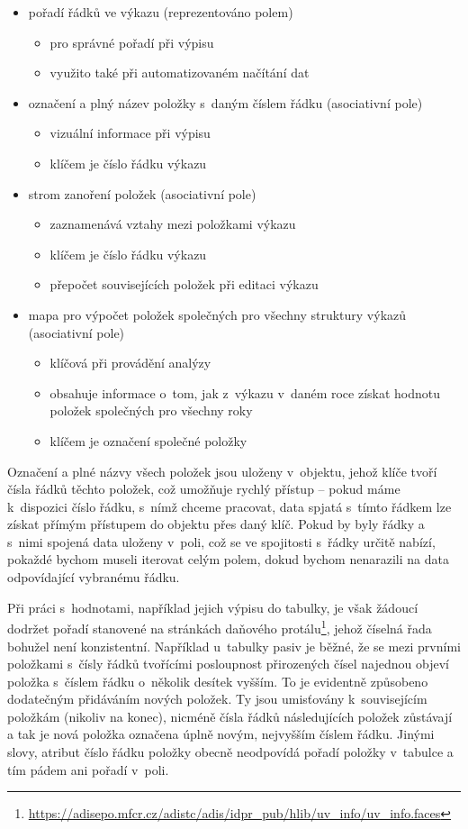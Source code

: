 \begin{itemize}
\item pořadí řádků ve výkazu (reprezentováno polem)
  \begin{itemize}
    \item pro správné pořadí při výpisu
    \item využito také při automatizovaném načítání dat
  \end{itemize}
\item označení a plný název položky s~daným číslem řádku (asociativní pole)
  \begin{itemize}
    \item vizuální informace při výpisu
    \item klíčem je číslo řádku výkazu
  \end{itemize}
\item strom zanoření položek (asociativní pole)
  \begin{itemize}
    \item zaznamenává vztahy mezi položkami výkazu
    \item klíčem je číslo řádku výkazu
    \item přepočet souvisejících položek při editaci výkazu
  \end{itemize}
\item mapa pro výpočet položek společných pro všechny struktury výkazů (asociativní pole)
  \begin{itemize}
    \item klíčová při provádění analýzy
    \item obsahuje informace o~tom, jak z~výkazu v~daném roce získat hodnotu položek společných pro všechny roky
    \item klíčem je označení společné položky
  \end{itemize}
\end{itemize} 


Označení a plné názvy všech položek jsou uloženy v~objektu, jehož klíče tvoří čísla řádků těchto položek, což umožňuje rychlý přístup -- pokud máme k~dispozici číslo řádku, s~nímž chceme pracovat, data spjatá s~tímto řádkem lze získat přímým přístupem do objektu přes daný klíč. Pokud by byly řádky a s~nimi spojená data uloženy v~poli, což se ve spojitosti s~řádky určitě nabízí, pokaždé bychom museli iterovat celým polem, dokud bychom nenarazili na data odpovídající vybranému řádku.

Při práci s~hodnotami, například jejich výpisu do tabulky, je však žádoucí dodržet pořadí stanovené na stránkách daňového protálu\footnote{\url{https://adisepo.mfcr.cz/adistc/adis/idpr_pub/hlib/uv_info/uv_info.faces}}, jehož číselná řada bohužel není konzistentní. Například u~tabulky pasiv je běžné, že se mezi prvními položkami s~čísly řádků tvořícími posloupnost přirozených čísel najednou objeví položka s~číslem řádku o~několik desítek vyšším. To je evidentně způsobeno dodatečným přidáváním nových položek. Ty jsou umisťovány k~souvisejícím položkám (nikoliv na konec), nicméně čísla řádků následujících položek zůstávají a tak je nová položka označena úplně novým, nejvyšším číslem řádku. Jinými slovy, atribut číslo řádku položky obecně neodpovídá pořadí položky v~tabulce a tím pádem ani pořadí v~poli.


